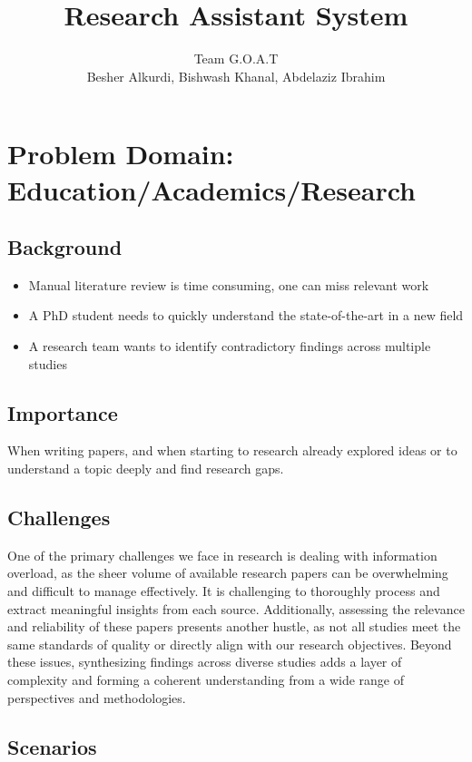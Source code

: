\documentclass{article}
\title{Research Assistant System}
\author{Team G.O.A.T\\
Besher Alkurdi, Bishwash Khanal, Abdelaziz Ibrahim}
\date{}
\begin{document}
\maketitle

\section*{Problem Domain: Education/Academics/Research}

\subsection*{Background}
\begin{itemize}
  \item Manual literature review is time consuming, one can miss relevant work
  \item A PhD student needs to quickly understand the state-of-the-art in a new field
  \item A research team wants to identify contradictory findings across multiple studies
\end{itemize}

\subsection*{Importance}
When writing papers, and when starting to research already explored ideas or to understand a topic deeply and find research gaps.

\subsection*{Challenges}
One of the primary challenges we face in research is dealing with information overload, as the sheer volume of available research papers can be overwhelming and difficult to manage effectively. It is challenging to thoroughly process and extract meaningful insights from each source. Additionally, assessing the relevance and reliability of these papers presents another hustle, as not all studies meet the same standards of quality or directly align with our research objectives. Beyond these issues, synthesizing findings across diverse studies adds a layer of complexity and forming a coherent understanding from a wide range of perspectives and methodologies.

\subsection*{Scenarios}
\end{document}
